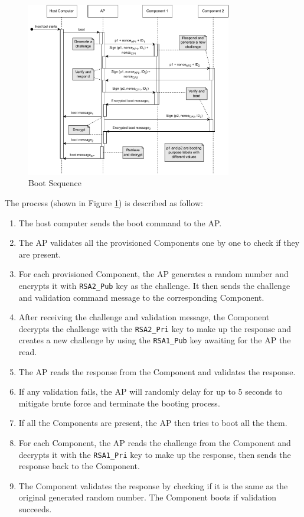 \documentclass[11pt,oneside,onecolumn,letterpaper]{article}
\begin{document}
	\begin{figure}[h]
		\centering
		\includegraphics[width=0.8\textwidth]{pics/boot.pdf}
		\caption{Boot Sequence}
		\label{fig:functionality_boot}
	\end{figure}
	
	The process (shown in Figure \ref{fig:functionality_boot}) is described as follow:
	\begin{enumerate}
		\item The host computer sends the boot command to the AP.
		\item The AP validates all the provisioned Components one by one to check if they are present.
		\item For each provisioned Component,
		the AP generates a random number and encrypts it with \texttt{RSA2\_Pub} key as the challenge.
		It then sends the challenge and validation command message to the corresponding Component.
		\item After receiving the challenge and validation message,
		the Component decrypts the challenge with the \texttt{RSA2\_Pri} key to make up the response and creates a new challenge by using the \texttt{RSA1\_Pub} key awaiting for the AP the read.
		\item The AP reads the response from the Component and validates the response.
		\item If any validation fails,
		the AP will randomly delay for up to 5 seconds to mitigate brute force and terminate the booting process.
		\item If all the Components are present,
		the AP then tries to boot all the them.
		\item For each Component,
		the AP reads the challenge from the Component and decrypts it with the \texttt{RSA1\_Pri} key to make up the response,
		then sends the response back to the Component.
		\item The Component validates the response by checking if it is the same as the original generated random number.
		The Component boots if validation succeeds.
	\end{enumerate}
	
\end{document}
